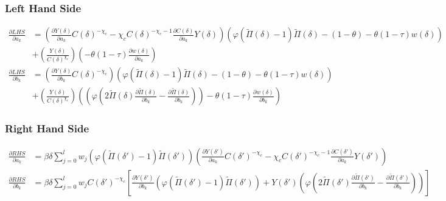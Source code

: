 \documentclass[11pt]{article}
\begin{document}
\subsubsection*{Left Hand Side}
\begin{align}
\frac{\partial LHS}{\partial a_k} &= \left(\frac{\partial Y(\delta)}{\partial a_k}C(\delta)^{-\chi_c} - \chi_cC(\delta)^{-\chi_c - 1}\frac{\partial C(\delta)}{\partial a_k}Y(\delta)\right)\left(\varphi (\tilde{\Pi}(\delta) - 1)\tilde{\Pi}(\delta) - (1 - \theta) - \theta (1-\tau)w(\delta)\right) \nonumber \\
& + \left(\frac{Y(\delta)}{C(\delta)^{\chi_{c}}}\right)\left(- \theta (1-\tau)\frac{\partial w(\delta)}{\partial a_k}\right)\\
\frac{\partial LHS}{\partial b_k} &= \left(\frac{\partial Y(\delta)}{\partial b_k}C(\delta)^{-\chi_c}\right)\left(\varphi (\tilde{\Pi}(\delta) - 1)\tilde{\Pi}(\delta) - (1 - \theta) - \theta (1-\tau)w(\delta)\right) \nonumber \\
& + \left(\frac{Y(\delta)}{C(\delta)^{\chi_{c}}}\right)\left(\left(\varphi\left(2\tilde{\Pi}(\delta)\frac{\partial \tilde{\Pi}(\delta)}{\partial b_k} - \frac{\partial \tilde{\Pi}(\delta)}{\partial b_k}\right)\right) - \theta (1-\tau)\frac{\partial w(\delta)}{\partial b_k}\right)
\end{align}

\subsubsection*{Right Hand Side}
\begin{align}
\frac{\partial RHS}{\partial a_k} &= \beta\delta\sum_{j = 0}^{l}w_j\left(\varphi(\tilde{\Pi}(\delta') - 1)\tilde{\Pi}(\delta')\right)\left(\frac{\partial Y(\delta')}{\partial a_k}C(\delta')^{-\chi_c} - \chi_cC(\delta')^{-\chi_c - 1}\frac{\partial C(\delta')}{\partial a_k}Y(\delta')\right) \\
\frac{\partial RHS}{\partial b_k} &=  \beta\delta\sum_{j = 0}^{l}w_jC(\delta')^{-\chi_c}\left[\frac{\partial Y(\delta')}{\partial b_k}\left(\varphi(\tilde{\Pi}(\delta') - 1)\tilde{\Pi}(\delta')\right) + Y(\delta')\left(\varphi\left(2\tilde{\Pi}(\delta')\frac{\partial \tilde{\Pi}(\delta')}{\partial b_k} - \frac{\partial \tilde{\Pi}(\delta')}{\partial b_k}\right)\right)\right] 
\end{align}
\end{document}
